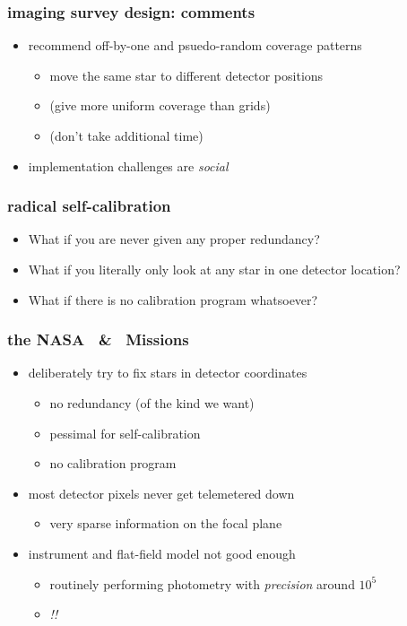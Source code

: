 \documentclass[pdftex]{beamer}
\begin{document}
\begin{frame}
  \frametitle{imaging survey design: comments}
  \begin{itemize}
  \item recommend off-by-one and psuedo-random coverage patterns
    \begin{itemize}
    \item move the same star to different detector positions
    \item (give more uniform coverage than grids)
    \item (don't take additional time)
    \end{itemize}
  \item implementation challenges are \emph{social}
  \end{itemize}
\end{frame}

\begin{frame}
  \frametitle{radical self-calibration}
  \begin{itemize}
  \item What if you are never given any proper redundancy?
  \item What if you literally only look at any star in one detector location?
  \item What if there is no calibration program whatsoever?
  \end{itemize}
\end{frame}

\begin{frame}
  \frametitle{the NASA \kepler\ \& \kt\ Missions}
  \begin{itemize}
  \item deliberately try to fix stars in detector coordinates
    \begin{itemize}
    \item no redundancy (of the kind we want)
    \item pessimal for self-calibration
    \item no calibration program
    \end{itemize}
  \item most detector pixels never get telemetered down
    \begin{itemize}
    \item very sparse information on the focal plane
    \end{itemize}
  \item instrument and flat-field model not good enough
    \begin{itemize}
    \item routinely performing photometry with \emph{precision} around $10^5$
    \item \emph{!!}
    \end{itemize}
  \end{itemize}
\end{frame}
\end{document}
